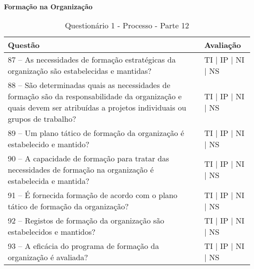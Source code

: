 \documentclass[openany,10pt,a4paper]{article}
\begin{document}
\begin{longtable}
\begin{appendix}
\begin{table}[h]
\textbf{Formação na Organização}
	\centering
	\caption{Questionário 1 - Processo - Parte 12}
	\begin{tabular}{p{3.5in}p{2in}}		
		\toprule
		\textbf{Questão}  & \textbf{Avaliação}\\ 
		\midrule
		87 – As necessidades de formação estratégicas da organização são estabelecidas e mantidas?
 & TI | IP | NI | NS \\
        \midrule
		88 – São determinadas quais as necessidades de formação são da responsabilidade da 
organização e quais devem ser atribuídas a projetos individuais ou grupos de trabalho?
 & TI | IP | NI | NS \\
		\midrule
		89 – Um plano tático de formação da organização é estabelecido e mantido?
 & TI | IP | NI | NS \\
		\midrule
        90 – A capacidade de formação para tratar das necessidades de formação na organização é 
estabelecida e mantida?
 & TI | IP | NI | NS \\
		\midrule
		91 – É fornecida formação de acordo com o plano tático de formação da organização?
  & TI | IP | NI | NS \\
		\midrule
		92 – Registos de formação da organização são estabelecidos e mantidos?
 & TI | IP | NI | NS \\
 \midrule
		93 – A eficácia do programa de formação da organização é avaliada?
 & TI | IP | NI | NS \\
		\bottomrule
	\end{tabular} 
	\label{tab:tabela1}
\end{table}


\end{appendix}
\end{longtable}
\end{document}
